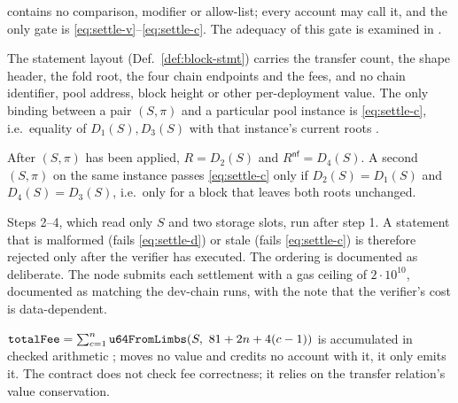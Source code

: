 \begin{property}[Caller]
\label{prop:apply-caller}
 contains no  comparison, modifier or
allow-list; every account may call it, and the only gate is
\eqref{eq:settle-v}--\eqref{eq:settle-c}.
The adequacy of this gate is examined in .
\end{property}

\begin{property}
\label{prop:apply-context}
The statement layout (Def.~\ref{def:block-stmt}) carries the transfer count,
the shape header, the fold root, the four chain endpoints and the fees, and
no chain identifier, pool address, block height or other per-deployment value.
The only binding between a pair $(S,\pi)$ and a particular pool instance is
\eqref{eq:settle-c}, i.e.\ equality of $D_1(S), D_3(S)$ with that instance's
current roots .
\end{property}

\begin{property}
\label{prop:apply-resubmit}
After $(S,\pi)$ has been applied, $R = D_2(S)$ and $R^{\mathsf{nf}} = D_4(S)$.
A second $(S,\pi)$ on the same instance passes
\eqref{eq:settle-c} only if $D_2(S)=D_1(S)$ and $D_4(S)=D_3(S)$, i.e.\ only for a
block that leaves both roots unchanged.
\end{property}

\begin{property}
\label{prop:apply-order}
Steps 2--4, which read only $S$ and two storage slots, run after step 1. A
statement that is malformed (fails \eqref{eq:settle-d}) or stale (fails
\eqref{eq:settle-c}) is therefore rejected only after the verifier has
executed. The ordering is documented as deliberate.
The node submits each settlement with a gas ceiling of $2\cdot 10^{10}$,
documented as matching the dev-chain runs, with the note that the verifier's
cost is data-dependent.
\end{property}

\begin{property}
\label{prop:apply-fee}
$\texttt{totalFee} = \sum_{c=1}^{n}\texttt{u64FromLimbs}(S,\ 81+2n+4(c-1))$ is
accumulated in checked  arithmetic
;  moves no
value and credits no account with it, it only emits it.
The contract does not check fee correctness; it relies on the transfer
relation's value conservation.
\end{property}

